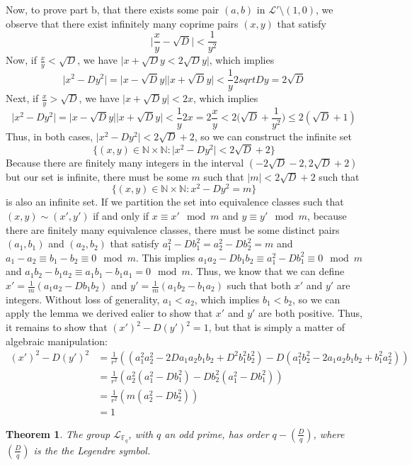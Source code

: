 \documentclass{article}
\newtheorem{theorem}{Theorem}
\newcommand{\legendre}[2]{\genfrac{(}{)}{}{}{#1}{#2}}
\begin{document}
Now, to prove part b, that there exists some pair $(a,b)$ in $\mathcal{L}' \setminus (1,0)$, we observe that there exist infinitely many coprime pairs $(x,y)$ that satisfy $$\lvert \frac{x}{y}-\sqrt{D} \rvert < \frac{1}{y^2}$$ Now, if $\frac{x}{y} < \sqrt{D}$, we have $\lvert x+\sqrt{D}y < 2\sqrt{D}y \rvert$, which implies $$\lvert x^2 - Dy^2 \rvert = \lvert x - \sqrt{D}y \rvert \lvert x+\sqrt{D}y \rvert < \frac{1}{y}2sqrt{D}y = 2\sqrt{D}$$ Next, if $\frac{x}{y} > \sqrt{D}$, we have $\lvert x + \sqrt{D}y \rvert < 2x$, which implies $$ \lvert x^2 - Dy^2 \rvert = \lvert x - \sqrt{D}y \rvert \lvert x+\sqrt{D}y \rvert < \frac{1}{y}2x = 2\frac{x}{y} < 2\bigg (\sqrt{D} + \frac{1}{y^2} \bigg ) \leq 2(\sqrt{D}+1) $$ Thus, in both cases, $\lvert x^2-Dy^2 \rvert < 2\sqrt{D}+2$, so we can construct the infinite set $$\{(x,y)\in \mathbb{N} \times \mathbb{N} : \lvert x^2-Dy^2 \rvert < 2\sqrt{D}+2 \}$$ Because there are finitely many integers in the interval $(-2\sqrt{D}-2, 2\sqrt{D}+2)$ but our set is infinite, there must be some $m$ such that $\lvert m \rvert < 2\sqrt{D}+2$ such that $$\{(x,y) \in \mathbb{N} \times \mathbb{N}:x^2-Dy^2 = m \}$$ is also an infinite set. If we partition the set into equivalence classes such that $(x,y) \sim (x',y')$ if and only if $x \equiv x' \mod m$ and $y \equiv y' \mod m$, because there are finitely many equivalence classes, there must be some distinct pairs $(a_1,b_1)$ and $(a_2,b_2)$ that satisfy $a_1^2-Db_1^2 = a_2^2-Db_2^2 = m$ and $a_1-a_2 \equiv b_1-b_2 \equiv 0 \mod m$. This implies $a_1a_2 -Db_1b_2 \equiv a_1^2-Db_1^2 \equiv 0 \mod m$ and $a_1b_2-b_1a_2 \equiv a_1b_1-b_1a_1 = 0 \mod m$. Thus, we know that we can define $x' = \frac{1}{m}(a_1a_2-Db_1b_2)$ and $y' = \frac{1}{m}(a_1b_2-b_1a_2)$ such that both $x'$ and $y'$ are integers. Without loss of generality, $a_1 < a_2$, which implies $b_1 < b_2$, so we can apply the lemma we derived ealier to show that $x'$ and $y'$ are both positive. Thus, it remains to show that $(x')^2-D(y')^2 = 1$, but that is simply a matter of algebraic manipulation:
\begin{align*}
    (x')^2-D(y')^2 &= \frac{1}{r^2}((a_1^2a_2^2 - 2Da_1a_2b_1b_2 + D^2b_1^2b_2^2) - D(a_1^2b_2^2 - 2a_1a_2b_1b_2 + b_1^2a_2^2)) \\
&= \frac{1}{r^2}(a_2^2(a_1^2-Db_1^2)-Db_2^2(a_1^2-Db_1^2)) \\
&= \frac{1}{r^2}(m(a_2^2-Db_2^2)) \\
&= 1
\end{align*}

\begin{theorem}
	The group $\mathcal{L}_{\mathbb{F}_q}$, with $q$ an odd prime, has order $q - \legendre{D}{q}$, where $\legendre{D}{q}$ is the the Legendre symbol.
\end{theorem}
\end{document}
